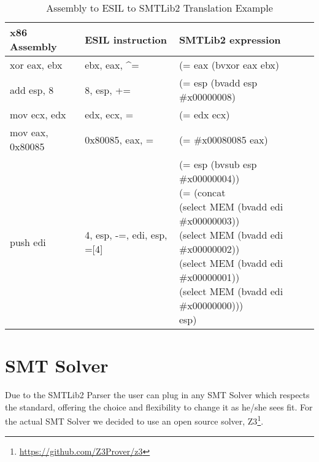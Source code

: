 \begin{table}[htp]
	\begin{center}
	\begin{tabular}{lll}
	\toprule
	\textbf{x86 Assembly} & \textbf{ESIL instruction} & \textbf{SMTLib2 expression} \\ \midrule
	xor eax, ebx & ebx, eax, \textasciicircum= & (= eax (bvxor eax ebx) \\ \midrule
	add esp, 8 & 8, esp, += & (= esp (bvadd esp \#x00000008) \\ \midrule
	mov ecx, edx & edx, ecx, = & (= edx ecx) \\ \midrule
	mov eax, 0x80085 & 0x80085, eax, = & (= \#x00080085 eax) \\ \midrule
	push edi & 4, esp, -=, edi, esp, =[4] & \shortstack[l]{(= esp (bvsub esp \#x00000004)) \\ (= (concat \\ \hspace{1.5cm}(select MEM (bvadd edi \#x00000003)) \\ \hspace{1.5cm}(select MEM (bvadd edi \#x00000002)) \\ \hspace{1.5cm}(select MEM (bvadd edi \#x00000001)) \\ \hspace{1.5cm}(select MEM (bvadd edi \#x00000000))) \\ \hspace{0.5cm}esp)} \\
	\bottomrule
	\end{tabular}
	\caption[Assembly to ESIL to SMTLib2 Translation Example]{
	Assembly to ESIL to SMTLib2 Translation Example%
	\footnotemark{}
	}
	\label{table:parsingExample}
	\end{center}
\end{table}


\section{SMT Solver}

Due to the SMTLib2 Parser the user can plug in any SMT Solver which respects the standard, offering the choice and flexibility to change it as he/she sees fit. For the actual SMT Solver we decided to use an open source solver, Z3\footnote{\url{https://github.com/Z3Prover/z3}}.

